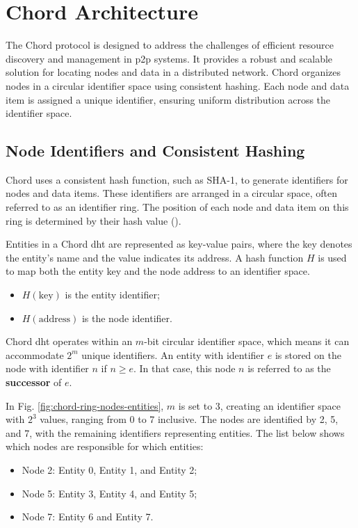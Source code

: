 \chapter{Chord Architecture}\label{chap:chord}
The Chord protocol is designed to address the challenges of efficient resource discovery and management in \gls{p2p} systems.
It provides a robust and scalable solution for locating nodes and data in a distributed network.
Chord organizes nodes in a circular identifier space using consistent hashing.
Each node and data item is assigned a unique identifier, ensuring uniform distribution across the identifier space.

\section{Node Identifiers and Consistent Hashing}
Chord uses a consistent hash function, such as SHA-1, to generate identifiers for nodes and data items.
These identifiers are arranged in a circular space, often referred to as an identifier ring.
The position of each node and data item on this ring is determined by their hash value (\cite{stoica2001}).

Entities in a Chord \gls{dht} are represented as key-value pairs, where the key denotes the entity's name and the value indicates its address.
A hash function $H$ is used to map both the entity key and the node address to an identifier space.
\begin{itemize}
    \item $H(\text{key})$ is the entity identifier;
	\item $H(\text{address})$ is the node identifier.
\end{itemize}

Chord \gls{dht} operates within an $m$-bit circular identifier space, which means it can accommodate $2^m$ unique identifiers.
An entity with identifier $e$ is stored on the node with identifier $n$ if $n \geq e$.
In that case, this node $n$ is referred to as the \textbf{successor} of $e$.

In Fig. \ref{fig:chord-ring-nodes-entities}, $m$ is set to 3, creating an identifier space with $2^3$ values, ranging from 0 to 7 inclusive.
The nodes are identified by 2, 5, and 7, with the remaining identifiers representing entities.
The list below shows which nodes are responsible for which entities:
\begin{itemize}
    \item Node 2: Entity 0, Entity 1, and Entity 2;
	\item Node 5: Entity 3, Entity 4, and Entity 5;
	\item Node 7: Entity 6 and Entity 7.
\end{itemize}
	
